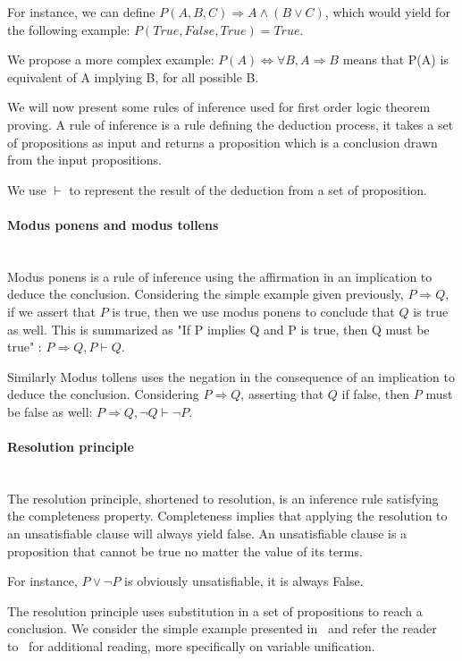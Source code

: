For instance, we can define $P(A,B,C) \Rightarrow A \wedge (B \vee C)$, which would yield for the following example: $P(True,False,True)=True$.

We propose a more complex example: $P(A) \Leftrightarrow \forall B, A \Rightarrow B$ means that P(A) is equivalent of A implying B, for all possible B.

We will now present some rules of inference used for first order logic theorem proving.
A rule of inference is a rule defining the deduction process, it takes a set of propositions as input and returns a proposition which is a conclusion drawn from the input propositions.

We use $\vdash$ to represent the result of the deduction from a set of proposition.

\paragraph{Modus ponens and modus tollens}\textbf{\\}
Modus ponens is a rule of inference using the affirmation in an implication to deduce the conclusion.
Considering the simple example given previously, $P \Rightarrow Q$, if we assert that $P$ is true, then we use modus ponens to conclude that $Q$ is true as well. This is summarized as "If P implies Q and P is true, then Q must be true" : $P \Rightarrow Q, P \vdash Q$.

Similarly Modus tollens uses the negation in the consequence of an implication to deduce the conclusion.
Considering $P \Rightarrow Q$, asserting that $Q$ if false, then $P$ must be false as well: $P \Rightarrow Q, \neg Q \vdash \neg P$.

\paragraph{Resolution principle}\textbf{\\}
The resolution principle, shortened to resolution, is an inference rule satisfying the completeness property. Completeness implies that applying the resolution to an unsatisfiable clause will always yield false. An unsatisfiable clause is a proposition that cannot be true no matter the value of its terms.

For instance, $P \vee \neg P$ is obviously unsatisfiable, \ie it is always False.

The resolution principle uses substitution in a set of propositions to reach a conclusion.
We consider the simple example presented in~\cite{snark-Stickel2000} and refer the reader to~\cite{symbolic-proof} for additional reading, more specifically on variable unification.

